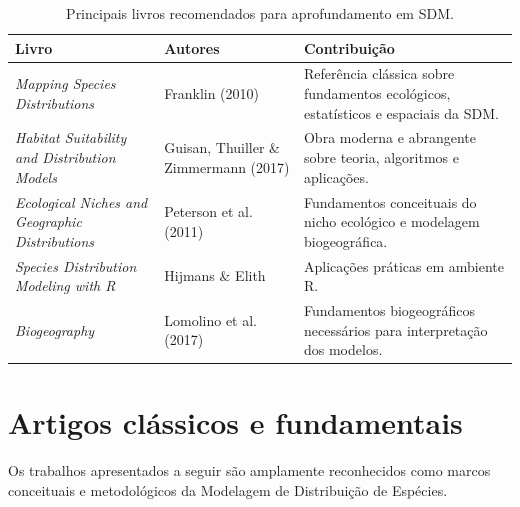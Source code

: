 \begin{table}[H]
	\centering
	\caption{Principais livros recomendados para aprofundamento em SDM.}
	\label{tab:livros_sdm}
	
	\small
	
	\begin{tabular}{
			p{}
			p{}
			p{}
		}
		
		\toprule
		
		\textbf{Livro} &
		\textbf{Autores} &
		\textbf{Contribuição}
		
		\\
		\midrule
		
		\textit{Mapping Species Distributions} &
		Franklin (2010) &
		Referência clássica sobre fundamentos ecológicos, estatísticos e espaciais da SDM.
		
		\\
		
		\textit{Habitat Suitability and Distribution Models} &
		Guisan, Thuiller \& Zimmermann (2017) &
		Obra moderna e abrangente sobre teoria, algoritmos e aplicações.
		
		\\
		
		\textit{Ecological Niches and Geographic Distributions} &
		Peterson et al. (2011) &
		Fundamentos conceituais do nicho ecológico e modelagem biogeográfica.
		
		\\
		
		\textit{Species Distribution Modeling with R} &
		Hijmans \& Elith &
		Aplicações práticas em ambiente R.
		
		\\
		
		\textit{Biogeography} &
		Lomolino et al. (2017) &
		Fundamentos biogeográficos necessários para interpretação dos modelos.
		
		\\
		
		\bottomrule
		
	\end{tabular}
	
\end{table}

\section{Artigos clássicos e fundamentais}

Os trabalhos apresentados a seguir são amplamente reconhecidos como marcos
conceituais e metodológicos da Modelagem de Distribuição de Espécies.

